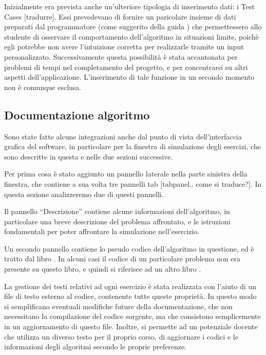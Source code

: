 Inizialmente era prevista anche un'ulteriore tipologia di inserimento
dati: i Test Cases {[}tradurre{]}. Essi prevedevano di fornire un
paricolare insieme di dati preparati dal programmatore (come suggerito
della guida \cite{wikiAlgoViz}) che permettessero allo studente di
osservare il comportamento dell'algoritmo in situazioni limite, poichè
egli potrebbe non avere l'intuizione corretta per realizzarle tramite
un input personalizzato. Successivamente questa possibilità è stata
accantonata per problemi di tempi nel completamento del progetto,
e per concentrarsi su altri aspetti dell'applicazione. L'inserimento
di tale funzione in un secondo momento non è comunque esclusa.


\subsection{Documentazione algoritmo}

Sono state fatte alcune integrazioni anche dal punto di vista dell'interfaccia
grafica del software, in particolare per la finestra di simulazione
degli esercizi, che sono descritte in questa e nelle due sezioni successive.

Per prima cosa è stato aggiunto un pannello laterale nella parte sinistra
della finestra, che contiene a sua volta tre pannelli tab {[}tabpanel..
come si traduce?{]}. In questa sezione analizzeremo due di questi
pannelli.

Il pannello {}``Descrizione'' contiene alcune informazioni dell'algoritmo,
in particolare una breve descrizione del problema affrontato, e le
istruzioni fondamentali per poter affrontare la simulazione nell'esercizio. 

Un secondo pannello contiene lo pseudo codice dell'algoritmo in questione,
ed è tratto dal libro \cite{libro}. In alcuni casi il codice di un
particolare problema non era presente su questo libro, e quindi si
riferisce ad un altro libro \cite{cormen}.

La gestione dei testi relativi ad ogni esercizio è stata realizzata
con l'aiuto di un file di testo esterno al codice, contenente tutte
queste proprietà. In questo modo si semplificano eventuali modifiche
future della documentazione, che non necessitano la compilazione del
codice sorgente, ma che consistono semplicemente in un aggiornamento
di questo file. Inoltre, si permette ad un potenziale docente che
utilizza un diverso testo per il proprio corso, di aggiornare i codici
e le informazioni degli algoritmi secondo le proprie preferenze.


